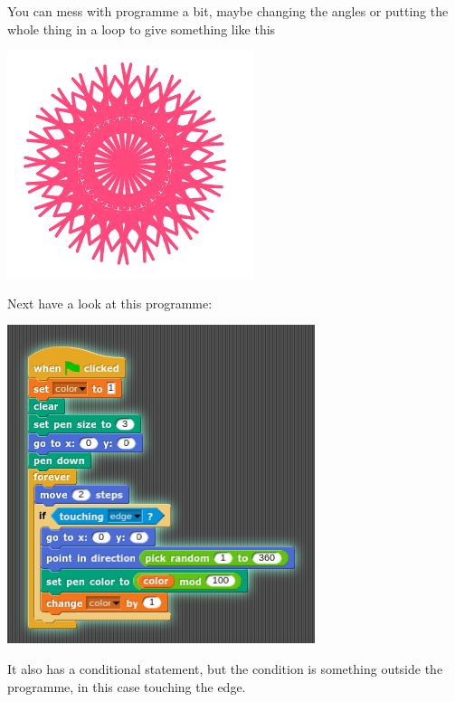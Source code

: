 \documentclass[11pt,a4paper]{scrartcl}
\begin{document}
You can mess with programme a bit, maybe changing the angles or
putting the whole thing in a loop to give something like this
\begin{center}
\includegraphics{rotating_star_pic.png}
\end{center}
Next have a look at this programme:
\begin{center}
\includegraphics{center_rays.png}
\end{center}
It also has a conditional statement, but the condition is something
outside the programme, in this case touching the edge.
\end{document}
